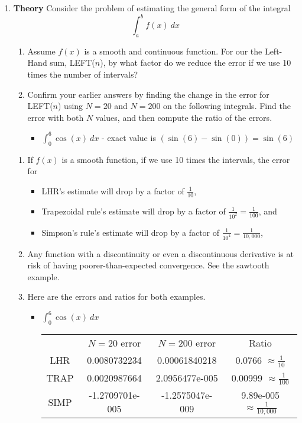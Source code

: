 \begin{enumerate}
\item {\bf Theory} Consider the problem of estimating the general form
  of the integral $$\int_a^b f(x)~dx$$
\begin{enumerate}
\item Assume $f(x)$ is a smooth and continuous function.  For our
  the Left-Hand sum, LEFT($n$), by what factor do we reduce the error if we use 10
  times the number of intervals?

\item Confirm your earlier answers by finding the change in the error
  for LEFT($n$) using $N=20$ and $N=200$ on the following integrals.
  Find the error with both $N$ values, and then compute the ratio of
  the errors.

\begin{itemize} 
  \item $\displaystyle \int_0^6 \cos(x)~dx$ - exact value is $(\sin(6) - \sin(0)) = \sin(6)$
\begin{center}
\end{center}

\begin{center}
\end{center}
\end{itemize} 

\end{enumerate}

\begin{Solution}
\begin{enumerate}
\item If $f(x)$ is a smooth function, if we use 10 times the
  intervals, the error for
\begin{itemize}
\item LHR's estimate will drop by a factor of $\frac{1}{10}$,
\item Trapezoidal rule's estimate will drop by a factor of
  $\frac{1}{10^2} = \frac{1}{100}$, and
\item Simpson's rule's estimate will drop by a factor of $\frac{1}{10^4} = \frac{1}{10,000}$,
\end{itemize}
\item Any function with a discontinuity or even a discontinuous
  derivative is at risk of having poorer-than-expected convergence.
  See the sawtooth example.

\item  Here are the errors and ratios for both examples.
\begin{itemize} 
  \item $\displaystyle \int_0^6 \cos(x)~dx$
\begin{tabular}{ cccc }
& $N=20$ error & $N=200$ error & Ratio \\
LHR &  0.0080732234 & 0.00061840218& 0.0766  $\approx \frac{1}{10}$\\
TRAP & 0.0020987664 & 2.0956477e-005& 0.00999  $\approx \frac{1}{100}$\\
SIMP & -1.2709701e-005 &  -1.2575047e-009 & 9.89e-005 $\approx \frac{1}{10,000}$ \\
\end{tabular}


\end{itemize}
\end{enumerate}
\end{Solution}
\end{enumerate}
